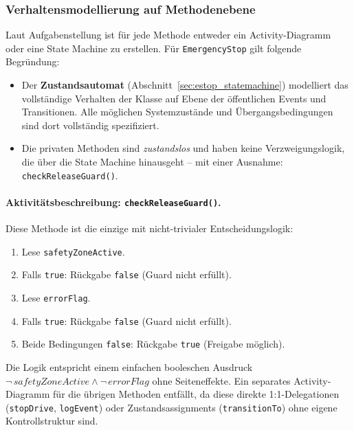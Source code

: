\subsubsection{Verhaltensmodellierung auf Methodenebene}

Laut Aufgabenstellung ist für jede Methode entweder ein Activity-Diagramm
oder eine State Machine zu erstellen.
Für \texttt{EmergencyStop} gilt folgende Begründung:

\begin{itemize}
  \item Der \textbf{Zustandsautomat} (Abschnitt~\ref{sec:estop_statemachine})
    modelliert das vollständige Verhalten der Klasse auf Ebene der
    öffentlichen Events und Transitionen. Alle möglichen Systemzustände
    und Übergangsbedingungen sind dort vollständig spezifiziert.
  \item Die privaten Methoden sind \emph{zustandslos} und haben keine
    Verzweigungslogik, die über die State Machine hinausgeht –
    mit einer Ausnahme: \texttt{checkReleaseGuard()}.
\end{itemize}

\paragraph{Aktivitätsbeschreibung: \texttt{checkReleaseGuard()}.}
Diese Methode ist die einzige mit nicht-trivialer Entscheidungslogik:

\begin{enumerate}
  \item Lese \texttt{safetyZoneActive}.
  \item Falls \texttt{true}: Rückgabe \texttt{false} (Guard nicht erfüllt).
  \item Lese \texttt{errorFlag}.
  \item Falls \texttt{true}: Rückgabe \texttt{false} (Guard nicht erfüllt).
  \item Beide Bedingungen \texttt{false}: Rückgabe \texttt{true} (Freigabe möglich).
\end{enumerate}

Die Logik entspricht einem einfachen booleschen Ausdruck
$\neg\,\mathit{safetyZoneActive} \wedge \neg\,\mathit{errorFlag}$
ohne Seiteneffekte. Ein separates Activity-Diagramm für die
übrigen Methoden entfällt, da diese direkte 1:1-Delegationen
(\texttt{stopDrive}, \texttt{logEvent}) oder Zustandsassignments
(\texttt{transitionTo}) ohne eigene Kontrollstruktur sind.
